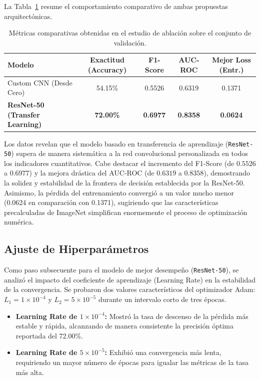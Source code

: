 \documentclass{article}
\begin{document}
La Tabla~\ref{tab:resultados} resume el comportamiento comparativo de ambas propuestas arquitectónicas.

\begin{table}[htbp]
  \caption{Métricas comparativas obtenidas en el estudio de ablación sobre el conjunto de validación.}
  \label{tab:resultados}
  \centering
  \begin{tabular}{lcccc}
    \toprule
    \textbf{Modelo} & \textbf{Exactitud (Accuracy)} & \textbf{F1-Score} & \textbf{AUC-ROC} & \textbf{Mejor Loss (Entr.)} \\
    \midrule
    Custom CNN (Desde Cero) & 54.15\% & 0.5526 & 0.6319 & 0.1371 \\
    \textbf{ResNet-50 (Transfer Learning)} & \textbf{72.00\%} & \textbf{0.6977} & \textbf{0.8358} & \textbf{0.0624} \\
    \bottomrule
  \end{tabular}
\end{table}

Los datos revelan que el modelo basado en transferencia de aprendizaje (\texttt{ResNet-50}) supera de manera sistemática a la red convolucional personalizada en todos los indicadores cuantitativos. Cabe destacar el incremento del F1-Score (de $0.5526$ a $0.6977$) y la mejora drástica del AUC-ROC (de $0.6319$ a $0.8358$), demostrando la solidez y estabilidad de la frontera de decisión establecida por la ResNet-50. Asimismo, la pérdida del entrenamiento convergió a un valor mucho menor (0.0624 en comparación con 0.1371), sugiriendo que las características precalculadas de ImageNet simplifican enormemente el proceso de optimización numérica.

\subsection{Ajuste de Hiperparámetros}
Como paso subsecuente para el modelo de mejor desempeño (\texttt{ResNet-50}), se analizó el impacto del coeficiente de aprendizaje (Learning Rate) en la estabilidad de la convergencia. Se probaron dos valores característicos del optimizador Adam: $L_1 = 1\times 10^{-4}$ y $L_2 = 5\times 10^{-5}$ durante un intervalo corto de tres épocas.

\begin{itemize}
    \item \textbf{Learning Rate de $1\times 10^{-4}$:} Mostró la tasa de descenso de la pérdida más estable y rápida, alcanzando de manera consistente la precisión óptima reportada del 72.00\%.
    \item \textbf{Learning Rate de $5\times 10^{-5}$:} Exhibió una convergencia más lenta, requiriendo un mayor número de épocas para igualar las métricas de la tasa más alta.
\end{itemize}
\end{document}
